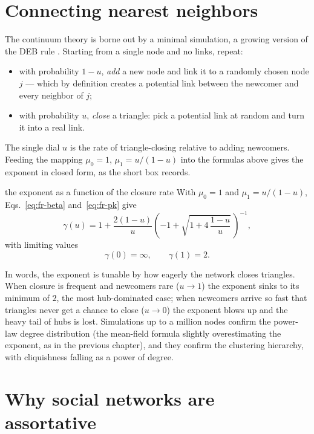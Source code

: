 \section{Connecting nearest neighbors}

The continuum theory is borne out by a minimal simulation, a growing version of
the DEB rule \citep{davidsen2002}. Starting from a single node and no links,
repeat:
\begin{itemize}
  \item with probability $1-u$, \emph{add} a new node and link it to a randomly
    chosen node $j$ --- which by definition creates a potential link between the
    newcomer and every neighbor of $j$;
  \item with probability $u$, \emph{close} a triangle: pick a potential link at
    random and turn it into a real link.
\end{itemize}
The single dial $u$ is the rate of triangle-closing relative to adding newcomers.
Feeding the mapping $\mu_0=1$, $\mu_1=u/(1-u)$ into the formulas above gives the
exponent in closed form, as the short box records.

\begin{calculation}{the exponent as a function of the closure rate}
With $\mu_0=1$ and $\mu_1=u/(1-u)$, Eqs.~\eqref{eq:fr-beta} and~\eqref{eq:fr-pk}
give
\begin{equation}
  \gamma(u) = 1 + \frac{2(1-u)}{u}
    \left(-1 + \sqrt{1 + 4\,\frac{1-u}{u}}\,\right)^{-1},
  \label{eq:fr-gammau}
\end{equation}
with limiting values
\begin{equation}
  \gamma(0) = \infty, \qquad \gamma(1) = 2.
  \label{eq:fr-limits}
\end{equation}
\end{calculation}

In words, the exponent is tunable by how eagerly the network closes triangles.
When closure is frequent and newcomers rare ($u\to 1$) the exponent sinks to its
minimum of $2$, the most hub-dominated case; when newcomers arrive so fast that
triangles never get a chance to close ($u\to 0$) the exponent blows up and the
heavy tail of hubs is lost. Simulations up to a million nodes confirm the
power-law degree distribution (the mean-field formula slightly overestimating the
exponent, as in the previous chapter), and they confirm the clustering hierarchy,
with cliquishness falling as a power of degree.

\section{Why social networks are assortative}

